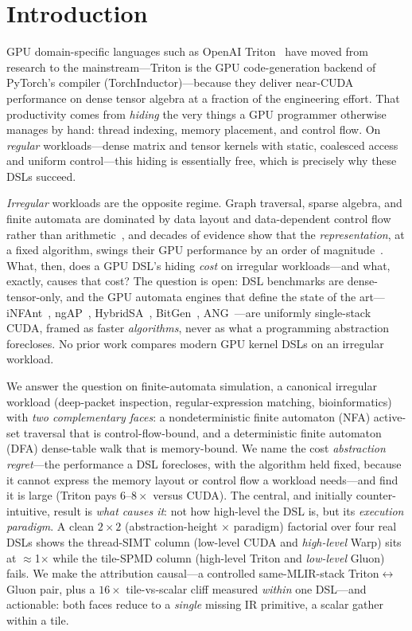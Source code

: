 \documentclass[conference]{IEEEtran}
\begin{document}
\section{Introduction}
GPU domain-specific languages such as OpenAI Triton~\cite{triton} have moved from research to
the mainstream---Triton is the GPU code-generation backend of PyTorch's compiler
(TorchInductor)---because they
deliver near-CUDA performance on dense tensor algebra at a fraction of the engineering effort.
That productivity comes from \emph{hiding} the very things a GPU programmer otherwise manages by
hand: thread indexing, memory placement, and control flow. On \emph{regular} workloads---dense
matrix and tensor kernels with static, coalesced access and uniform control---this hiding is
essentially free, which is precisely why these DSLs succeed.

\emph{Irregular} workloads are the opposite regime. Graph traversal, sparse algebra, and finite
automata are dominated by data layout and data-dependent control flow rather than
arithmetic~\cite{burtscher}, and decades of evidence show that the \emph{representation}, at a
fixed algorithm, swings their GPU performance by an order of magnitude~\cite{bestsf,sparsetir}.
What, then, does a GPU DSL's hiding \emph{cost} on irregular workloads---and what, exactly,
causes that cost? The question is open: DSL benchmarks are dense-tensor-only, and the GPU
automata engines that define the state of the art---iNFAnt~\cite{infant}, ngAP~\cite{ngap},
HybridSA~\cite{hybridsa}, BitGen~\cite{bitgen}, ANG~\cite{ang}---are uniformly single-stack CUDA,
framed as faster \emph{algorithms}, never as what a programming abstraction forecloses. No prior
work compares modern GPU kernel DSLs on an irregular workload.

We answer the question on finite-automata simulation, a canonical irregular workload
(deep-packet inspection, regular-expression matching, bioinformatics) with \emph{two
complementary faces}: a nondeterministic finite automaton (NFA) active-set traversal that is
control-flow-bound, and a deterministic finite automaton (DFA)
dense-table walk that is memory-bound. We name the cost \emph{abstraction regret}---the
performance a DSL forecloses, with the algorithm held fixed, because it cannot express the
memory layout or control flow a workload needs---and find it is large (Triton pays $6$--$8\times$
versus CUDA). The central, and initially counter-intuitive, result is \emph{what causes it}:
not how high-level the DSL is, but its \emph{execution paradigm}. A clean $2\times2$
(abstraction-height $\times$ paradigm) factorial over four real DSLs shows the thread-SIMT
column (low-level CUDA and \emph{high-level} Warp) sits at $\approx$1$\times$ while the tile-SPMD
column (high-level Triton and \emph{low-level} Gluon) fails. We make the attribution causal---a
controlled same-MLIR-stack Triton$\leftrightarrow$Gluon pair, plus a $16\times$ tile-vs-scalar
cliff measured \emph{within} one DSL---and actionable: both faces reduce to a \emph{single}
missing IR primitive, a scalar gather within a tile.
\end{document}
